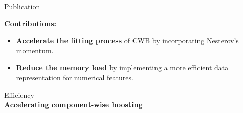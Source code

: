 \documentclass[t,10pt]{beamer}
\newcommand{\fSlide}[2]{
\begin{frame}[plain]{}%
  \vspace{4cm}%
  \Large #1\\[0.2cm]%
  {\LARGE\textbf{#2}}%
	\addtocounter{framenumber}{-1}%
\end{frame}%
}
\begin{document}
\begin{frame}{Publication~\citep{schalk2022accelerated}}
  
  \begin{figure}
    \centering
  \end{figure}
  \textbf{Contributions:}
  \begin{itemize}
    \item
      \textbf{Accelerate the fitting process} of CWB by incorporating Nesterov's momentum.
    \item
      \textbf{Reduce the memory load} by implementing a more efficient data representation for numerical features.
  \end{itemize}
\end{frame}

\fSlide{Efficiency}{Accelerating component-wise boosting}
\end{document}
